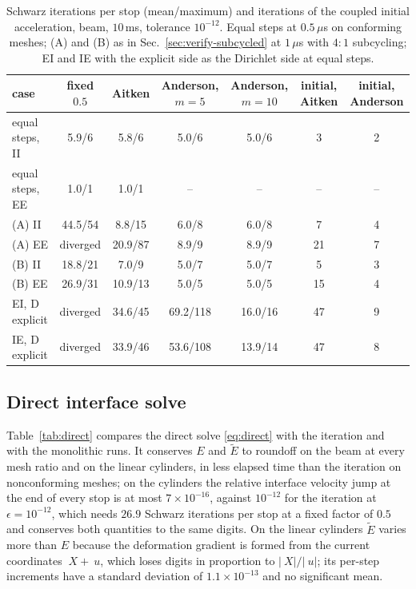 \documentclass[11pt]{article}
\begin{document}
\begin{table}[htbp]
\centering
\footnotesize\setlength{\tabcolsep}{3pt}
\caption{Schwarz iterations per stop (mean/maximum) and iterations of the
coupled initial acceleration, beam, $10$\,ms, tolerance $10^{-12}$. Equal
steps at $0.5\,\mu$s on conforming meshes; (A) and (B) as in
Sec.~\ref{sec:verify-subcycled} at $1\,\mu$s with $4{:}1$ subcycling; EI
and IE with the explicit side as the Dirichlet side at equal steps.}
\label{tab:solvers}
\begin{tabular}{lcccccc}
\toprule
case & fixed $0.5$ & Aitken & Anderson, $m = 5$ & Anderson, $m = 10$ & initial, Aitken & initial, Anderson \\
\midrule
equal steps, II & 5.9/6 & 5.8/6 & 5.0/6 & 5.0/6 & 3 & 2 \\
equal steps, EE & 1.0/1 & 1.0/1 & -- & -- & -- & -- \\
(A) II & 44.5/54 & 8.8/15 & 6.0/8 & 6.0/8 & 7 & 4 \\
(A) EE & diverged & 20.9/87 & 8.9/9 & 8.9/9 & 21 & 7 \\
(B) II & 18.8/21 & 7.0/9 & 5.0/7 & 5.0/7 & 5 & 3 \\
(B) EE & 26.9/31 & 10.9/13 & 5.0/5 & 5.0/5 & 15 & 4 \\
EI, D explicit & diverged & 34.6/45 & 69.2/118 & 16.0/16 & 47 & 9 \\
IE, D explicit & diverged & 33.9/46 & 53.6/108 & 13.9/14 & 47 & 8 \\
\bottomrule
\end{tabular}
\end{table}

\subsection{Direct interface solve}

Table~\ref{tab:direct} compares the direct solve \eqref{eq:direct} with the
iteration and with the monolithic runs. It conserves $E$ and $\tilde{E}$ to
roundoff on the beam at every mesh ratio and on the linear cylinders, in
less elapsed time than the iteration on nonconforming meshes; on the
cylinders the
relative interface velocity jump at the end of every stop is at most
$7\times 10^{-16}$, against $10^{-12}$ for the iteration at
$\epsilon = 10^{-12}$, which needs $26.9$ Schwarz iterations per stop at a
fixed factor of $0.5$ and conserves both quantities to the same digits. On the linear cylinders $\tilde{E}$ varies more than
$E$ because the deformation gradient is formed from the current
coordinates $~X + ~u$, which loses digits in proportion to
$\lvert ~X \rvert / \lvert ~u \rvert$; its per-step increments have a
standard deviation of $1.1\times 10^{-13}$ and no significant mean.
\end{document}
